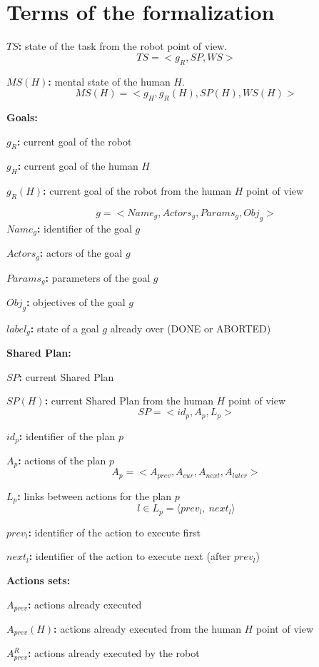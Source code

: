 \chapter{Terms of the formalization}
\label{chap:annexe1}


\hspace{18pt} \textbf{$TS$:} state of the task from the robot point of view.
$$TS = <g_R, SP, WS>$$

\textbf{$MS(H)$:} mental state of the human $H$.
$$MS(H) = <g_H, g_R(H), SP(H), WS(H)>$$

\bigskip
\textbf{Goals:}

\textbf{$g_R$:} current goal of the robot

\textbf{$g_H$:} current goal of the human $H$

\textbf{$g_R(H)$:} current goal of the robot from the human $H$ point of view

$$g = <Name_g, Actors_g, Params_g, Obj_g>$$
\indent \textbf{$Name_g$:} identifier of the goal $g$

\textbf{$Actors_g$:} actors of the goal $g$

\textbf{$Params_g$:} parameters of the goal $g$

\textbf{$Obj_g$:} objectives of the goal $g$

\textbf{$label_g$:} state of a goal $g$ already over (DONE or ABORTED)

\bigskip
\textbf{Shared Plan:}

\textbf{$SP$:} current Shared Plan

\textbf{$SP(H)$:} current Shared Plan from the human $H$ point of view
$$SP = <id_p, A_p, L_p>$$

\textbf{$id_p$:} identifier of the plan $p$

\textbf{$A_p$:} actions of the plan $p$
$$A_p = <A_{prev}, A_{cur}, A_{next}, A_{later}>$$

\textbf{$L_p$:} links between actions for the plan $p$
 $$l \in L_p = \langle prev_l, \ next_l \rangle$$

\textbf{$prev_l$:} identifier of the action to execute first

\textbf{$next_l$:} identifier of the action to execute next (after $prev_l$)

\bigskip
\textbf{Actions sets:}

\textbf{$A_{prev}$:} actions already executed

\textbf{$A_{prev}(H)$:} actions already executed from the human $H$ point of view

\textbf{$A_{prev}^R$:} actions already executed by the robot

